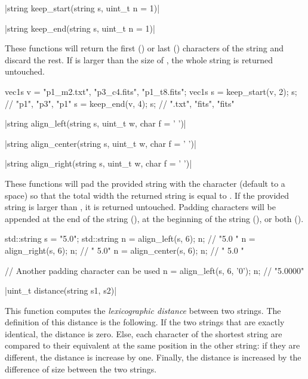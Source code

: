 {\funcitem \vectorfunc \cppinline|string keep_start(string s, uint_t n = 1)| 

\vectorfunc \cppinline|string keep_end(string s, uint_t n = 1)| 

These functions will return the first () or last ()  characters of the string  and discard the rest. If  is larger than the size of , the whole string is returned untouched.

\begin{example}
\begin{cppcode}
vec1s v = {"p1_m2.txt", "p3_c4.fits", "p1_t8.fits"};
vec1s s = keep_start(v, 2);
s; // {"p1", "p3", "p1"}
s = keep_end(v, 4);
s; // {".txt", "fits", "fits"}
\end{cppcode}
\end{example}

\funcitem \vectorfunc \cppinline|string align_left(string s, uint_t w, char f = ' ')| 

\vectorfunc \cppinline|string align_center(string s, uint_t w, char f = ' ')| 

\vectorfunc \cppinline|string align_right(string s, uint_t w, char f = ' ')| 

These functions will pad the provided string with the character  (default to a space) so that the total width the returned string is equal to . If the provided string is larger than , it is returned untouched. Padding characters will be appended at the end of the string (), at the beginning of the string (), or both ().

\begin{example}
\begin{cppcode}
std::string s = "5.0";
std::string n = align_left(s, 6);
n; // "5.0   "
n = align_right(s, 6);
n; // "   5.0"
n = align_center(s, 6);
n; // " 5.0  "

// Another padding character can be used
n = align_left(s, 6, '0');
n; // "5.0000"
\end{cppcode}
\end{example}

\funcitem \vectorfunc \cppinline|uint_t distance(string s1, s2)| 

This function computes the \emph{lexicographic distance} between two strings. The definition of this distance is the following. If the two strings that are exactly identical, the distance is zero. Else, each character of the shortest string are compared to their equivalent at the same position in the other string: if they are different, the distance is increase by one. Finally, the distance is increased by the difference of size between the two strings.

}
